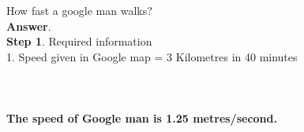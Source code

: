 \documentclass[11pt]{exam}
\begin{document}
\begin{questions}
\question
\label{Q19:Speed of a Google man}
How fast a google man walks? \\
\textbf{Answer}. \\
\textbf{Step 1}. Required information \\
                 1. Speed given in Google map = 3 Kilometres in 40 minutes\\
\\
 \\ \\
                 \textbf{The speed of Google man is 1.25 metres/second.} \\ \\ \\ \\ \\ \\ \\ \\ \\ \\ \\ \\ \\ \\ \\ 



\end{questions}
\end{document}
